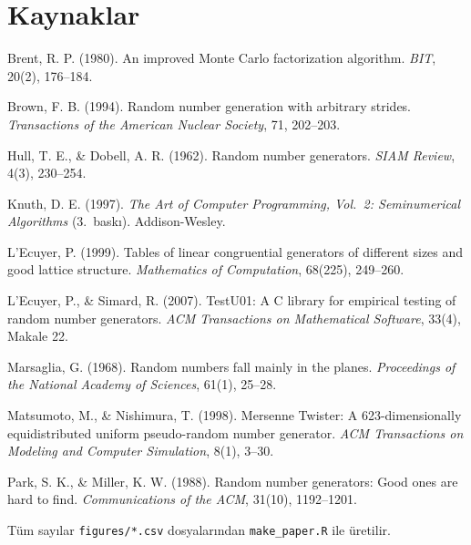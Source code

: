\documentclass[11pt,a4paper]{article}
\begin{document}
\section*{Kaynaklar}
{\small
\setlength{\parskip}{2pt}
\hangindent=1.27cm Brent, R. P. (1980). An improved Monte Carlo factorization algorithm. \textit{BIT}, 20(2), 176--184.\par
\hangindent=1.27cm Brown, F. B. (1994). Random number generation with arbitrary strides. \textit{Transactions of the American Nuclear Society}, 71, 202--203.\par
\hangindent=1.27cm Hull, T. E., \& Dobell, A. R. (1962). Random number generators. \textit{SIAM Review}, 4(3), 230--254.\par
\hangindent=1.27cm Knuth, D. E. (1997). \textit{The Art of Computer Programming, Vol.\ 2: Seminumerical Algorithms} (3.\ baskı). Addison-Wesley.\par
\hangindent=1.27cm L'Ecuyer, P. (1999). Tables of linear congruential generators of different sizes and good lattice structure.
\textit{Mathematics of Computation}, 68(225), 249--260.\par
\hangindent=1.27cm L'Ecuyer, P., \& Simard, R. (2007). TestU01: A C library for empirical testing of random number generators.
\textit{ACM Transactions on Mathematical Software}, 33(4), Makale 22.\par
\hangindent=1.27cm Marsaglia, G. (1968). Random numbers fall mainly in the planes. \textit{Proceedings of the National Academy of Sciences}, 61(1), 25--28.\par
\hangindent=1.27cm Matsumoto, M., \& Nishimura, T. (1998). Mersenne Twister: A 623-dimensionally equidistributed uniform pseudo-random number
generator. \textit{ACM Transactions on Modeling and Computer Simulation}, 8(1), 3--30.\par
\hangindent=1.27cm Park, S. K., \& Miller, K. W. (1988). Random number generators: Good ones are hard to find. \textit{Communications of the ACM},
31(10), 1192--1201.\par

\smallskip
Tüm sayılar
\texttt{figures/*.csv} dosyalarından \texttt{make\_paper.R} ile üretilir.
}
\end{document}
